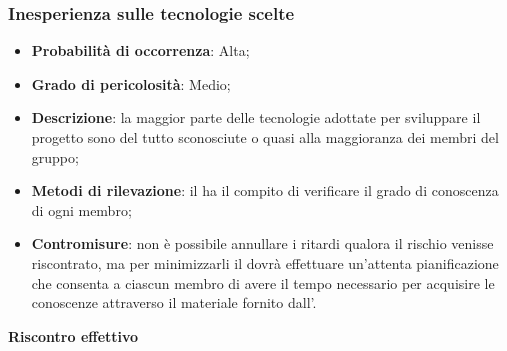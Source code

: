 		\subsubsection{Inesperienza sulle tecnologie scelte} %
		\label{ssub:inesperienza_sulle_tecnlogie_scelte}
			\begin{itemize}
				\item \textbf{Probabilità di occorrenza}: Alta;
				\item \textbf{Grado di pericolosità}: Medio;
				\item \textbf{Descrizione}: la maggior parte delle tecnologie adottate per sviluppare il progetto sono del tutto sconosciute o quasi alla maggioranza dei membri del gruppo;
				\item \textbf{Metodi di rilevazione}: il \roleProjectManager{} ha il compito di verificare il grado di conoscenza di ogni membro;
				\item \textbf{Contromisure}: non è possibile annullare i ritardi qualora il rischio venisse riscontrato, ma per minimizzarli il \roleProjectManager{} dovrà effettuare un'attenta pianificazione che consenta a ciascun membro di avere il tempo necessario per acquisire le conoscenze attraverso il materiale fornito dall'\roleAdministrator.
			\end{itemize}
		\noindent
		\textbf{Riscontro effettivo}
